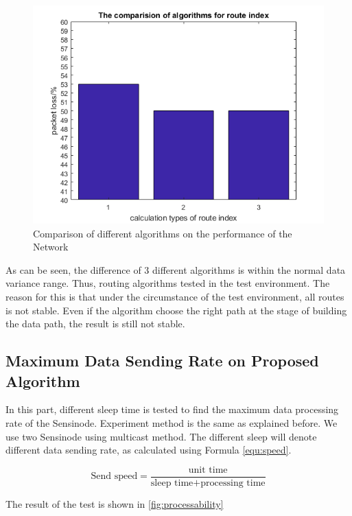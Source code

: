 \begin{figure}
    \centering
    \includegraphics{Figures/algorithm.png}
    \caption{Comparison of different algorithms on the performance of the Network}
    \label{fig:algorithm_comp}
\end{figure}

As can be seen, the difference of 3 different algorithms is within the normal data variance range. Thus, routing algorithms tested in the test environment.
The reason for this is that under the circumstance of the test environment, all routes is not stable. Even if the algorithm choose the right path at the stage of building the data path, the result is still not stable.

\subsection{Maximum Data Sending Rate on Proposed Algorithm}

In this part, different sleep time is tested to find the maximum data processing rate of the Sensinode. Experiment method is the same as explained before. We use two Sensinode using multicast method. The different sleep will denote different data sending rate, as calculated using Formula \ref{equ:speed}. 

\begin{equation}
    \text{Send speed} = 
     \frac{\text{unit time}}{\text{sleep time} + \text{processing time}}
\label{equ:speed}
\end{equation}

The result of the test is shown in \ref{fig:processability}

